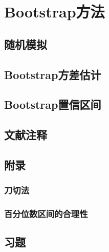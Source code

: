 \chapter{Bootstrap方法}

\section{随机模拟}

\pending

\section{Bootstrap方差估计}

\pending

\section{Bootstrap置信区间}

\pending

\section{文献注释}

\pending

\section{附录}

\subsection{刀切法}

\pending


\subsection{百分位数区间的合理性}

\pending

\section{习题}

\pending
